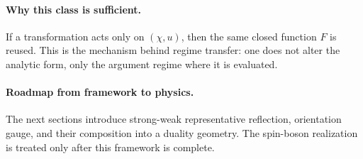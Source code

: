 \paragraph{Why this class is sufficient.}
If a transformation acts only on \((\chi,u)\), then the same closed function \(F\) is reused.
This is the mechanism behind regime transfer: one does not alter the analytic form, only the
argument regime where it is evaluated.

\paragraph{Roadmap from framework to physics.}
The next sections introduce strong-weak representative reflection, orientation gauge, and their
composition into a duality geometry.
The spin-boson realization is treated only after this framework is complete.
